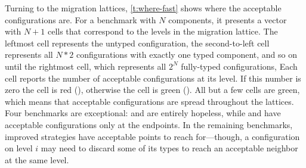 Turning to the migration lattices, \cref{t:where-fast} shows where the acceptable
configurations are.
For a benchmark with $N$ components, it presents a vector with $N+1$ cells
that correspond to the levels in the migration lattice.
The leftmost cell represents the untyped configuration,
the second-to-left cell represents all $N * 2$ configurations with exactly one
typed component, and so on until the rightmost cell, which
represents all $2^N$ fully-typed configurations,
Each cell reports the number of acceptable configurations at its level.
If this number is zero the cell is red (\rboxtiny{}), otherwise
the cell is green (\gboxtiny{}).
All but a few cells are green, which means that acceptable configurations
are spread throughout the lattices.
Four benchmarks are exceptional:
 and  are entirely hopeless, while
 and  have acceptable configurations only
at the endpoints.
In the remaining benchmarks, improved strategies have acceptable points to
reach for---though, a configuration on level $i$ may need to discard
some of its types to reach an acceptable neighbor at the same level.


